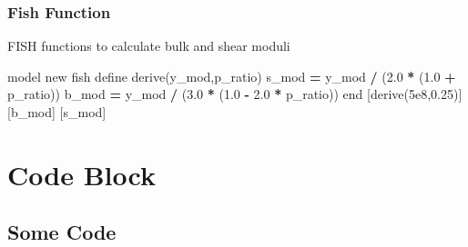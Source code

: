 \documentclass[a4paper, nobind]{templates/ociamthesis}
\newenvironment{Shaded}{\begin{snugshade}}{\end{snugshade}}
\newcommand{\FloatTok}[1]{\textcolor[rgb]{0.00,0.00,0.81}{#1}}
\newcommand{\NormalTok}[1]{#1}
\newcommand{\OperatorTok}[1]{\textcolor[rgb]{0.81,0.36,0.00}{\textbf{#1}}}
\renewenvironment{Shaded}
{
  \vspace{10pt}%
  \begin{snugshade}%
}{%
  \end{snugshade}%
  \vspace{8pt}%
}
\begin{document}
\hypertarget{fish-function}{%
\subsection{Fish Function}\label{fish-function}}

FISH functions to calculate bulk and shear moduli

\begin{Shaded}
\begin{Highlighting}[]
\NormalTok{model new}
\NormalTok{fish define derive(y\_mod,p\_ratio)}
\NormalTok{    s\_mod }\OperatorTok{=}\NormalTok{ y\_mod }\OperatorTok{/}\NormalTok{ (}\FloatTok{2.0} \OperatorTok{*}\NormalTok{ (}\FloatTok{1.0} \OperatorTok{+}\NormalTok{ p\_ratio))}
\NormalTok{    b\_mod }\OperatorTok{=}\NormalTok{ y\_mod }\OperatorTok{/}\NormalTok{ (}\FloatTok{3.0} \OperatorTok{*}\NormalTok{ (}\FloatTok{1.0} \OperatorTok{{-}} \FloatTok{2.0} \OperatorTok{*}\NormalTok{ p\_ratio))}
\NormalTok{end}
\NormalTok{[derive(}\FloatTok{5e8}\NormalTok{,}\FloatTok{0.25}\NormalTok{)]}
\NormalTok{[b\_mod] }
\NormalTok{[s\_mod]}
\end{Highlighting}
\end{Shaded}

\newpage

\hypertarget{code-block}{%
\chapter{Code Block}\label{code-block}}

\hypertarget{some-code}{%
\section{Some Code}\label{some-code}}
\end{document}
